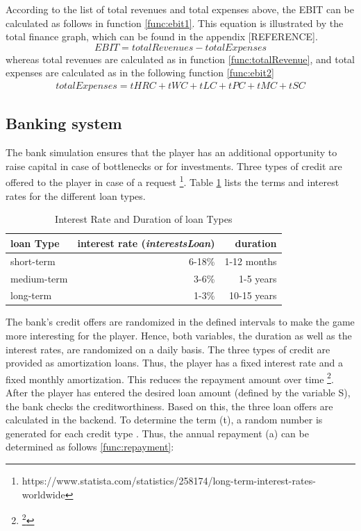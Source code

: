 According to the list of total revenues and total expenses above, the EBIT can be calculated as follows in function \ref{func:ebit1}. This equation is illustrated by the total finance graph, which can be found in the appendix [REFERENCE]. 
\begin{equation}
\label{func:ebit1}
    EBIT = totalRevenues - totalExpenses
\end{equation}
whereas total revenues are calculated as in function \ref{func:totalRevenue}, and total expenses are calculated as in the following function \ref{func:ebit2}
\begin{equation}
    \label{func:ebit2}
    \begin{aligned}
       totalExpenses = tHRC + tWC + tLC + tPC + tMC + tSC
    \end{aligned}
\end{equation}

\subsection{Banking system}
\label{sec: banking}

The bank simulation ensures that the player has an additional opportunity to raise capital in case of bottlenecks or for investments. Three types of credit are offered to the player in case of a request \footnote{https://www.statista.com/statistics/258174/long-term-interest-rates-worldwide}. Table \ref{loan_types} lists the terms and interest rates for the different loan types. 

\begin{table}[ht]
\centering
\begin{tabular}{|l|r|r|}
\hline
loan Type       & interest rate (\textit{interestsLoan})     & duration \\ \hline
short-term      & 6-18\%           & 1-12 months    \\
medium-term     & 3-6\%            & 1-5 years     \\
long-term       & 1-3\%             & 10-15 years     \\
\hline
\end{tabular}
\caption{Interest Rate and Duration of loan Types}
\label{loan_types}
\end{table}

The bank's credit offers are randomized in the defined intervals to make the game more interesting for the player. Hence, both variables, the duration as well as the interest rates, are randomized on a daily basis. The three types of credit are provided as amortization loans. Thus, the player has a fixed interest rate and a fixed monthly amortization. This reduces the repayment amount over time \footnote{\footnote{https://www.investopedia.com/terms/a/amortized\_loan.asp}}.
After the player has entered the desired loan amount (defined by the variable S), the bank checks the creditworthiness. Based on this, the three loan offers are calculated in the backend. To determine the term (t), a random number is generated for each credit type . Thus, the annual repayment (a) can be determined as follows \ref{func:repayment}:

